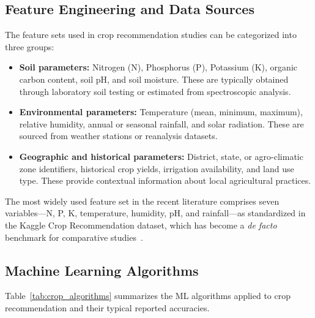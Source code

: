 \documentclass[journal]{IEEEtran}
\begin{document}
\subsection{Feature Engineering and Data Sources}

The feature sets used in crop recommendation studies can be categorized into three groups:

\begin{itemize}[leftmargin=*]
  \item \textbf{Soil parameters:} Nitrogen (N), Phosphorus (P), Potassium (K), organic carbon content, soil pH, and soil moisture. These are typically obtained through laboratory soil testing or estimated from spectroscopic analysis.
  
  \item \textbf{Environmental parameters:} Temperature (mean, minimum, maximum), relative humidity, annual or seasonal rainfall, and solar radiation. These are sourced from weather stations or reanalysis datasets.
  
  \item \textbf{Geographic and historical parameters:} District, state, or agro-climatic zone identifiers, historical crop yields, irrigation availability, and land use type. These provide contextual information about local agricultural practices.
\end{itemize}

The most widely used feature set in the recent literature comprises seven variables---N, P, K, temperature, humidity, pH, and rainfall---as standardized in the Kaggle Crop Recommendation dataset, which has become a \textit{de facto} benchmark for comparative studies~\cite{kalimuthu2020crop}.

\subsection{Machine Learning Algorithms}

Table~\ref{tab:crop_algorithms} summarizes the ML algorithms applied to crop recommendation and their typical reported accuracies.
\end{document}
